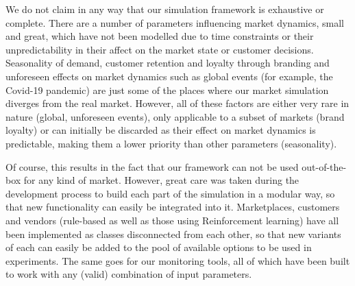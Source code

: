 We do not claim in any way that our simulation framework is exhaustive or complete. There are a number of parameters influencing market dynamics, small and great, which have not been modelled due to time constraints or their unpredictability in their affect on the market state or customer decisions. Seasonality of demand, customer retention and loyalty through branding and unforeseen effects on market dynamics such as global events (for example, the Covid-19 pandemic) are just some of the places where our market simulation diverges from the real market. However, all of these factors are either very rare in nature (global, unforeseen events), only applicable to a subset of markets (brand loyalty) or can initially be discarded as their effect on market dynamics is predictable, making them a lower priority than other parameters (seasonality).

Of course, this results in the fact that our framework can not be used out-of-the-box for any kind of market. However, great care was taken during the development process to build each part of the simulation in a modular way, so that new functionality can easily be integrated into it. Marketplaces, customers and vendors (rule-based as well as those using Reinforcement learning) have all been implemented as classes disconnected from each other, so that new variants of each can easily be added to the pool of available options to be used in experiments. The same goes for our monitoring tools, all of which have been built to work with any (valid) combination of input parameters.
